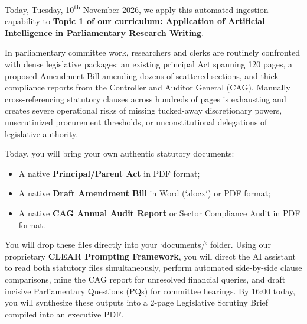 \documentclass[11pt, a4paper]{report}
\begin{document}
Today, Tuesday, 10\textsuperscript{th} November 2026, we apply this automated ingestion capability to \textcolor{tanzaniablue}{\textbf{Topic 1 of our curriculum: Application of Artificial Intelligence in Parliamentary Research Writing}}.

In parliamentary committee work, researchers and clerks are routinely confronted with dense legislative packages: an existing principal Act spanning 120 pages, a proposed Amendment Bill amending dozens of scattered sections, and thick compliance reports from the Controller and Auditor General (CAG). Manually cross-referencing statutory clauses across hundreds of pages is exhausting and creates severe operational risks of missing tucked-away discretionary powers, unscrutinized procurement thresholds, or unconstitutional delegations of legislative authority.

Today, you will bring your own authentic statutory documents:
\begin{itemize}[label=-]
    \item A native \textcolor{suagreen}{\textbf{Principal/Parent Act}} in PDF format;
    \item A native \textcolor{tanzaniablue}{\textbf{Draft Amendment Bill}} in Word (`.docx`) or PDF format;
    \item A native \textcolor{suagreen}{\textbf{CAG Annual Audit Report}} or Sector Compliance Audit in PDF format.
\end{itemize}

You will drop these files directly into your `documents/` folder. Using our proprietary \textcolor{tanzaniablue}{\textbf{CLEAR Prompting Framework}}, you will direct the AI assistant to read both statutory files simultaneously, perform automated side-by-side clause comparisons, mine the CAG report for unresolved financial queries, and draft incisive Parliamentary Questions (PQs) for committee hearings. By 16:00 today, you will synthesize these outputs into a 2-page Legislative Scrutiny Brief compiled into an executive PDF.
\end{document}
